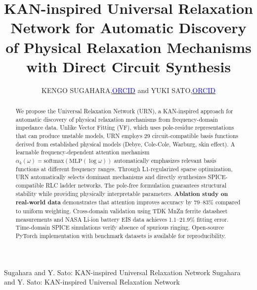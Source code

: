 \documentclass{ieeeaccess}
\newcommand{\orcidicon}[1]{\href{https://orcid.org/#1}{\textcolor{blue}{ORCID}}}
\begin{document}

\title{KAN-inspired Universal Relaxation Network for Automatic Discovery of Physical Relaxation Mechanisms with Direct Circuit Synthesis}

\author{
\uppercase{Kengo Sugahara},\orcidicon{0000-0002-2200-311X} and
\uppercase{Yuki Sato},\orcidicon{0000-0002-4052-5966}
}

\address[1]{Faculty of Science and Engineering, Kindai University, Higashi-Osaka 577-8502, Japan}
\address[2]{Department of Electrical and Electronic Engineering, Aoyama Gakuin University, Sagamihara 252-5258, Japan}


\markboth
{Sugahara and Y. Sato: KAN-inspired Universal Relaxation Network}
{Sugahara and Y. Sato: KAN-inspired Universal Relaxation Network}


\begin{abstract}
We propose the Universal Relaxation Network (URN), a KAN-inspired approach for automatic discovery of physical relaxation mechanisms from frequency-domain impedance data. Unlike Vector Fitting (VF), which uses pole-residue representations that can produce unstable models, URN employs 29 circuit-compatible basis functions derived from established physical models (Debye, Cole-Cole, Warburg, skin effect). A learnable frequency-dependent attention mechanism $\alpha_k(\omega) = \text{softmax}(\text{MLP}(\log\omega))$ automatically emphasizes relevant basis functions at different frequency ranges. Through L1-regularized sparse optimization, URN automatically selects dominant mechanisms and directly synthesizes SPICE-compatible RLC ladder networks. The pole-free formulation guarantees structural stability while providing physically interpretable parameters. \textbf{Ablation study on real-world data} demonstrates that attention improves accuracy by 79--83\% compared to uniform weighting. Cross-domain validation using TDK MnZn ferrite datasheet measurements and NASA Li-ion battery EIS data achieves 1.1--21.9\% fitting error. Time-domain SPICE simulations verify absence of spurious ringing. Open-source PyTorch implementation with benchmark datasets is available for reproducibility.
\end{abstract}
\end{document}
